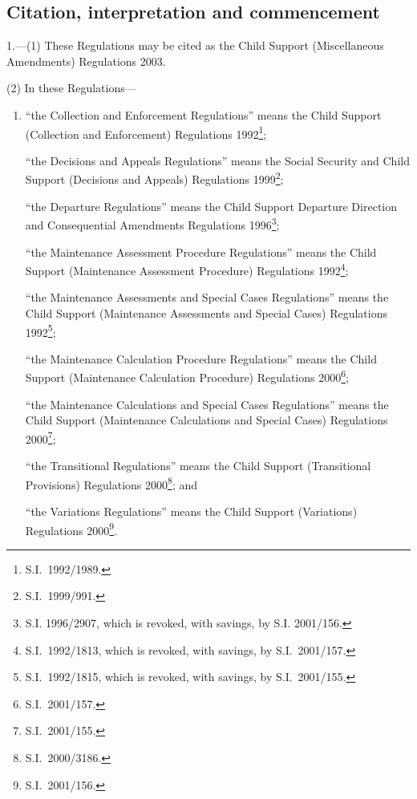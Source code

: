 \documentclass[12pt,a4paper]{article}
\begin{document}
\bigskip

\setcounter{secnumdepth}{-2}

\subsection[1. Citation, interpretation and commencement]{Citation, interpretation and commencement}

1.---(1)  These Regulations may be cited as the Child Support (Miscellaneous Amendments) Regulations 2003.

(2) In these Regulations—
\begin{enumerate}\item[]
“the Collection and Enforcement Regulations” means the Child Support (Collection and Enforcement) Regulations 1992\footnote{S.I.\ 1992/1989.};

“the Decisions and Appeals Regulations” means the Social Security and Child Support (Decisions and Appeals) Regulations 1999\footnote{S.I.\ 1999/991.};

“the Departure Regulations” means the Child Support Departure Direction and Consequential Amendments Regulations 1996\footnote{S.I. 1996/2907, which is revoked, with savings, by S.I. 2001/156.};

“the Maintenance Assessment Procedure Regulations” means the Child Support (Maintenance Assessment Procedure) Regulations 1992\footnote{S.I.\ 1992/1813, which is revoked, with savings, by S.I.\ 2001/157.};

“the Maintenance Assessments and Special Cases Regulations” means the Child Support (Maintenance Assessments and Special Cases) Regulations 1992\footnote{S.I.\ 1992/1815, which is revoked, with savings, by S.I.\ 2001/155.};

“the Maintenance Calculation Procedure Regulations” means the Child Support (Maintenance Calculation Procedure) Regulations 2000\footnote{S.I.\ 2001/157.};

“the Maintenance Calculations and Special Cases Regulations” means the Child Support (Maintenance Calculations and Special Cases) Regulations 2000\footnote{S.I.\ 2001/155.};

“the Transitional Regulations” means the Child Support (Transitional Provisions) Regulations 2000\footnote{S.I.\ 2000/3186.}; and

“the Variations Regulations” means the Child Support (Variations) Regulations 2000\footnote{S.I.\ 2001/156.}.
\end{enumerate}
\end{document}
